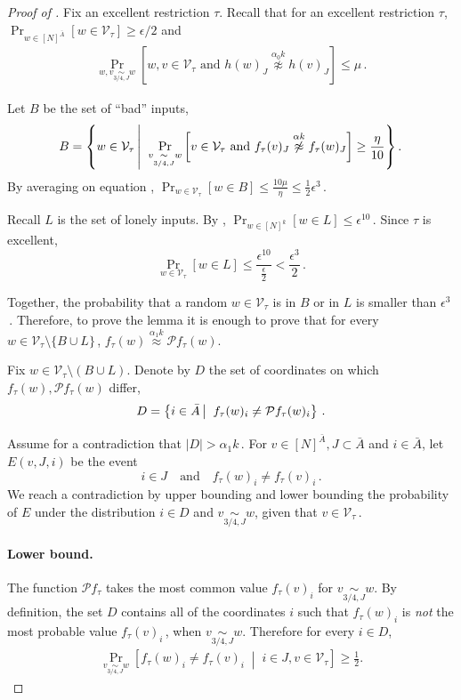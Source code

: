 \documentclass[11pt]{article}
\numberwithin{equation}{section}
\theoremstyle{definition}
\theoremstyle{plain}
\newcommand{\Prob}[2][]{\Pr_{{#1}}\left[#2\right]} %
\newcommand{\brac}[1]{[#1]} %
\newcommand{\abs}[1]{\lvert#1\rvert} %
\newcommand{\given}{\;\middle\vert\;} %
\newcommand\sett[2]{\left\{ #1 \left| \; \vphantom{#1 #2} \right. #2  \right\}} %
\newcommand\f{f} %
\newcommand\h{h} %
\newcommand\bh{\mathcal{P}\f_\tau} %
\newcommand\neql[1]{\stackrel{{#1}}{ \approx}} %
\newcommand\neqg[1]{\stackrel{{#1}}{ \not\approx}} %
\newcommand\cons{\mathcal{V}} %
\newcommand\cor[1]{\underset{\scriptscriptstyle#1}{\sim}} %
\begin{document}
\begin{proof}[Proof of ]
	Fix an excellent restriction $\tau$. 
	Recall that for an excellent restriction $\tau$, $\Pr_{w\in \brac{N}^{\bar{A}}}[w\in \cons_\tau]\geq 
	\epsilon/2$ %
	 and
	\begin{align}\label{eq:recall excellent}
		\Prob[w,v\cor{3/4,J}{w}]{  w,v\in \cons_\tau\textrm{ and } \h(w)_J\neqg{\alpha_0 k}\h(v)_J}\leq \mu\,.
	\end{align}
	
    Let $B$ be the set of ``bad'' inputs,
	\[ B = \sett{w\in \cons_\tau}{\Prob[v\cor{3/4,J}w]{v\in \cons_\tau \textrm{ and } \f_\tau(v)_J\neqg{\alpha k}\f_\tau(w)_J} \geq \frac{\eta}{10}}.\,\]%
	By averaging on equation , $\Pr_{w\in\cons_\tau}[w\in B]\leq \frac{10\mu}{\eta}\leq \frac{1}{2}\epsilon^3$\,. 
	
	Recall $L$ is the set of lonely inputs. By , $\Pr_{w\in[N]^k}[w\in L]\leq \epsilon^{10}$\,. Since $\tau$ is excellent, 
	\[\Pr_{w\in\cons_\tau}[w\in L] \leq \frac{\epsilon^{10}}{\frac{\epsilon}{2}}< \frac{\epsilon^3}{2}\,. \]%
	
	Together, the probability that a random $w\in\cons_\tau$ is in $B$ or in $L$ is smaller than $\epsilon^3$\,. 
	Therefore, to prove the lemma it is enough to prove that for every $w\in \cons_\tau\setminus \{B\cup L\}$\,, $\f_\tau(w)\neql{\alpha_1 k}\bh(w)$.
	
	Fix $w\in\cons_\tau\setminus(B\cup L)$. Denote by $D$ the set of coordinates on which $\f_\tau(w),\bh(w)$ differ,
	\[ D = \sett{i\in \bar{A}}{\f_\tau(w)_i \neq \bh(w)_i}\,.\] %
	
Assume %
for  %
a contradiction that $\abs{D}> \alpha_1 k$\,. For $v\in[N]^{\bar{A}},J\subset \bar{A}$ and $i\in\bar{A} $, let $E(v,J,i)$  be the event
	\[ i\in J \quad\textrm{and}\quad  \f_\tau(w)_i \neq \f_\tau(v)_i\,.\]%
	We reach a contradiction by upper bounding and lower bounding the probability of $E$ under the distribution $i\in D$ and $v\cor{3/4,J}w$, given that $v\in \cons_\tau$\,.
	
	\paragraph*{Lower bound.}
	The function $\bh$ takes the most common value $\f_\tau(v)_i$ for $v\cor{3/4,J}w$. By definition, the set $D$ contains all of the coordinates $i$ such that $\f_\tau(w)_i$ is \emph{not} the most probable value $\f_\tau(v)_i$\,, when $v\cor{3/4,J}w$. Therefore for every $i\in D$,
	\begin{align}\label{eq:bad i}
	\Prob[v\cor{3/4,J}w]{\f_\tau(w)_i \neq \f_\tau(v)_i \given i\in J, v\in \cons_\tau} \geq \frac{1}{2}.
	\end{align}
	

\end{proof}
\end{document}
